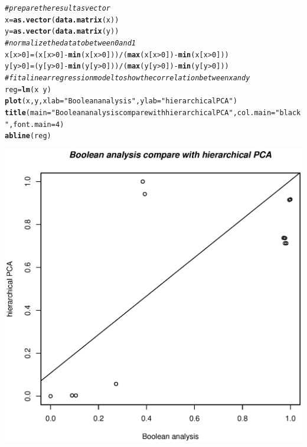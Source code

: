 \documentclass{article}\usepackage[]{graphicx}\usepackage[]{color}
\makeatletter
\def\maxwidth{ %
  \ifdim\Gin@nat@width>\linewidth
    \linewidth
  \else
    \Gin@nat@width
  \fi
}
\newcommand{\hlnum}[1]{\textcolor[rgb]{0.686,0.059,0.569}{#1}}%
\newcommand{\hlstr}[1]{\textcolor[rgb]{0.192,0.494,0.8}{#1}}%
\newcommand{\hlcom}[1]{\textcolor[rgb]{0.678,0.584,0.686}{\textit{#1}}}%
\newcommand{\hlopt}[1]{\textcolor[rgb]{0,0,0}{#1}}%
\newcommand{\hlstd}[1]{\textcolor[rgb]{0.345,0.345,0.345}{#1}}%
\newcommand{\hlkwb}[1]{\textcolor[rgb]{0.69,0.353,0.396}{#1}}%
\newcommand{\hlkwc}[1]{\textcolor[rgb]{0.333,0.667,0.333}{#1}}%
\newcommand{\hlkwd}[1]{\textcolor[rgb]{0.737,0.353,0.396}{\textbf{#1}}}%
\newenvironment{kframe}{%
 \def\at@end@of@kframe{}%
 \ifinner\ifhmode%
  \def\at@end@of@kframe{\end{minipage}}%
  \begin{minipage}{\columnwidth}%
 \fi\fi%
 \def\FrameCommand##1{\hskip\@totalleftmargin \hskip-\fboxsep
 \colorbox{shadecolor}{##1}\hskip-\fboxsep
     \hskip-\linewidth \hskip-\@totalleftmargin \hskip\columnwidth}%
 \MakeFramed {\advance\hsize-\width
   \@totalleftmargin\z@ \linewidth\hsize
   \@setminipage}}%
 {\par\unskip\endMakeFramed%
 \at@end@of@kframe}
\newenvironment{knitrout}{}{} %
\makeatother
\begin{document}
\begin{knitrout}
\color{fgcolor}\begin{kframe}
\begin{alltt}
\hlcom{#prepare the result as vector}
\hlstd{x}\hlkwb{=}\hlkwd{as.vector}\hlstd{(}\hlkwd{data.matrix}\hlstd{(x))}
\hlstd{y}\hlkwb{=}\hlkwd{as.vector}\hlstd{(}\hlkwd{data.matrix}\hlstd{(y))}
\hlcom{#normalize the data to between 0 and 1}
\hlstd{x[x}\hlopt{>}\hlnum{0}\hlstd{]}\hlkwb{=}\hlstd{(x[x}\hlopt{>}\hlnum{0}\hlstd{]}\hlopt{-}\hlkwd{min}\hlstd{(x[x}\hlopt{>}\hlnum{0}\hlstd{]))}\hlopt{/}\hlstd{(}\hlkwd{max}\hlstd{(x[x}\hlopt{>}\hlnum{0}\hlstd{])}\hlopt{-}\hlkwd{min}\hlstd{(x[x}\hlopt{>}\hlnum{0}\hlstd{]))}
\hlstd{y[y}\hlopt{>}\hlnum{0}\hlstd{]}\hlkwb{=}\hlstd{(y[y}\hlopt{>}\hlnum{0}\hlstd{]}\hlopt{-}\hlkwd{min}\hlstd{(y[y}\hlopt{>}\hlnum{0}\hlstd{]))}\hlopt{/}\hlstd{(}\hlkwd{max}\hlstd{(y[y}\hlopt{>}\hlnum{0}\hlstd{])}\hlopt{-}\hlkwd{min}\hlstd{(y[y}\hlopt{>}\hlnum{0}\hlstd{]))}
\hlcom{#fit a linear regression model to show the correlation between x and y }
\hlstd{reg}\hlkwb{=}\hlkwd{lm}\hlstd{(x}\hlopt{~}\hlstd{y)}
\hlkwd{plot}\hlstd{(x, y,}\hlkwc{xlab}\hlstd{=}\hlstr{"Boolean analysis"}\hlstd{,}\hlkwc{ylab}\hlstd{=}\hlstr{"hierarchical PCA"}\hlstd{)}
\hlkwd{title}\hlstd{(}\hlkwc{main}\hlstd{=}\hlstr{"Boolean analysis compare with hierarchical PCA"}\hlstd{,} \hlkwc{col.main}\hlstd{=}\hlstr{"black"}\hlstd{,} \hlkwc{font.main}\hlstd{=}\hlnum{4}\hlstd{)}
\hlkwd{abline}\hlstd{(reg)}
\end{alltt}
\end{kframe}
\includegraphics[width=\maxwidth]{figure/plot_result} 

\end{knitrout}
\end{document}

